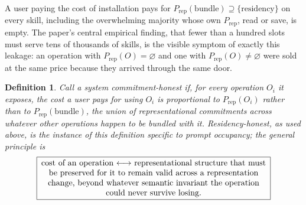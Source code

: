 \documentclass[11pt]{article}
\newtheorem{definition}{Definition}
\begin{document}
A user paying the cost of installation pays for $P_{\text{rep}}(\text{bundle}) \supseteq \{\text{residency}\}$ on every skill, including the overwhelming majority whose own $P_{\text{rep}}$, read or save, is empty. The paper's central empirical finding, that fewer than a hundred slots must serve tens of thousands of skills, is the visible symptom of exactly this leakage: an operation with $P_{\text{rep}}(O) = \varnothing$ and one with $P_{\text{rep}}(O) \neq \varnothing$ were sold at the same price because they arrived through the same door.

\begin{definition}
Call a system \emph{commitment-honest} if, for every operation $O_i$ it exposes, the cost a user pays for using $O_i$ is proportional to $P_{\text{rep}}(O_i)$ rather than to $P_{\text{rep}}(\text{bundle})$, the union of representational commitments across whatever other operations happen to be bundled with it. \emph{Residency-honest}, as used above, is the instance of this definition specific to prompt occupancy; the general principle is
\[
\boxed{\begin{minipage}{0.8\textwidth}\centering cost of an operation $\longleftrightarrow$ representational structure that must be preserved for it to remain valid across a representation change, beyond whatever semantic invariant the operation could never survive losing.\end{minipage}}
\]
\end{definition}
\end{document}

